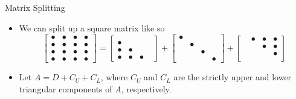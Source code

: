 \documentclass[10pt]{beamer}
\begin{document}
\begin{frame}{Matrix Splitting}
\begin{itemize}
    \item We can split up a square matrix like so
    $$
        \begin{bmatrix}\bullet & \bullet & \bullet & \bullet  \\
                    \bullet & \bullet & \bullet & \bullet \\
                    \bullet & \bullet & \bullet & \bullet \\
                    \bullet & \bullet & \bullet & \bullet \end{bmatrix} = 
            \begin{bmatrix}
                 &  &  &  \\
                \bullet &  &  &  \\
                \bullet & \bullet &  &  \\
                \bullet & \bullet & \bullet &  \end{bmatrix} +
            \begin{bmatrix}
                \bullet & &  & \\
                 & \bullet & &  \\
                 &  & \bullet &  \\
                 &  &  & \bullet \end{bmatrix} + 
            \begin{bmatrix}
                 & \bullet & \bullet & \bullet \\
                 &  & \bullet & \bullet \\
                 &  &  & \bullet \\
                 &  &  &  \end{bmatrix}        
    $$
    \bigskip
    \item Let $A = D  + C_U +  C_L$, where $C_U$ and $C_L$ are the strictly upper and lower triangular components of $A$, respectively.
    \bigskip
\end{itemize}
\end{frame}

\end{document}
